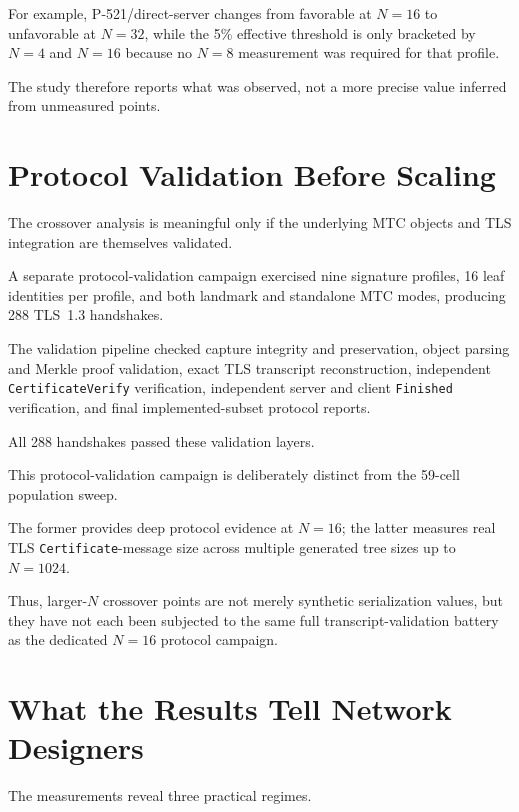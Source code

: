 \documentclass[journal]{IEEEtran}
\begin{document}
For example, P-521/direct-server changes from favorable at $N=16$ to unfavorable at $N=32$, while the 5\% effective threshold is only bracketed by $N=4$ and $N=16$ because no $N=8$ measurement was required for that profile.

The study therefore reports what was observed, not a more precise value inferred from unmeasured points.



\section{Protocol Validation Before Scaling}



The crossover analysis is meaningful only if the underlying MTC objects and TLS integration are themselves validated.



A separate protocol-validation campaign exercised nine signature profiles, 16 leaf identities per profile, and both landmark and standalone MTC modes, producing 288 TLS~1.3 handshakes.

The validation pipeline checked capture integrity and preservation, object parsing and Merkle proof validation, exact TLS transcript reconstruction, independent \texttt{CertificateVerify} verification, independent server and client \texttt{Finished} verification, and final implemented-subset protocol reports.

All 288 handshakes passed these validation layers.



This protocol-validation campaign is deliberately distinct from the 59-cell population sweep.

The former provides deep protocol evidence at $N=16$; the latter measures real TLS \texttt{Certificate}-message size across multiple generated tree sizes up to $N=1024$.

Thus, larger-$N$ crossover points are not merely synthetic serialization values, but they have not each been subjected to the same full transcript-validation battery as the dedicated $N=16$ protocol campaign.



\section{What the Results Tell Network Designers}



The measurements reveal three practical regimes.
\end{document}
